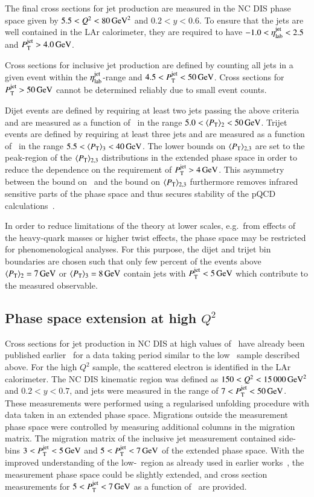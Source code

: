 \documentclass[12pt]{article}
\begin{document}
The final cross sections for jet production are  measured in the NC DIS phase space
given by $5.5 < Q^2 < 80\,\GeVsq$ and $0.2 < y < 0.6$. 
To ensure that the jets are well contained in the LAr calorimeter, 
they are required to have $-1.0 < \etalab < 2.5$ and $\ptjet > 4.0\,\GeV$.

Cross sections for inclusive jet production are defined by counting all jets in a given 
event within the $\etalab$-range and $4.5 < \ptjet < 50\,\GeV$.
Cross sections for $\ptjet>50\,\GeV$ cannot be determined reliably due to 
small event counts.

Dijet events are defined by requiring at least two jets
passing the above criteria and are measured as a function of \meanptdi\ 
in the range $5.0<\meanptdi<50\,\GeV$.
Trijet events are defined by requiring at least three jets and
 are measured as a function of \meanpttri\ in the range $5.5<\meanpttri<40\,\GeV$.
The lower bounds on $\meanpt_{2,3}$ are set to the peak-region of the $\meanpt_{2,3}$ distributions in the extended 
phase space in order to reduce the  dependence on the requirement of $\ptjet>4\,\GeV$.
This asymmetry between the bound on \ptjet\ and the bound on $\meanpt_{2,3}$ furthermore 
 removes infrared sensitive parts of the phase space and thus secures 
stability of the pQCD calculations~\cite{NNLO,IRinsens,JetVip1}.

In order to reduce limitations of the theory at lower scales, e.g.\ from effects of the 
 heavy-quark masses or higher twist effects, the phase space may be 
restricted for phenomenological analyses.
For this purpose, the dijet and trijet bin boundaries are chosen such that 
only few percent of the events above $\meanptdi=7\,\GeV$ or $\meanpttri=8\,\GeV$ 
contain jets with $\ptjet<5\,\GeV$ which contribute to the measured observable.

\begin{boldmath}
\subsection{Phase space extension at high $Q^2$}
\label{sec:pshigh}
\end{boldmath}

Cross sections for jet production in NC DIS at high values of \Qsq\
have already been 
published earlier~\cite{H1Multijets} for a data taking period similar to the low \Qsq\ sample described above. For the high $Q^2$ sample,  
the scattered electron is identified in the LAr calorimeter.
The NC DIS kinematic region was defined as $150<\Qsq<15\,000\,\GeVsq$ and $0.2<y<0.7$, 
and jets were measured in the range of $7<\ptjet<50\,\GeV$.
These measurements were performed using a regularised unfolding procedure with  
data taken in an extended phase space. Migrations outside the measurement phase space 
were controlled by measuring additional columns in the migration matrix.
The migration matrix of the inclusive jet measurement contained side-bins 
$3<\ptjet<5\,\GeV$ and $5<\ptjet<7\,\GeV$ of the extended phase space.
With the improved understanding of the low-\ptjet\ region as already used in earlier works~\cite{DiffDijetsLRG,DiffDijetsVFPS}, 
the measurement phase space could be slightly extended, and cross section measurements for $5<\ptjet<7\,\GeV$ 
as a function of \Qsq\ are provided.
\end{document}
